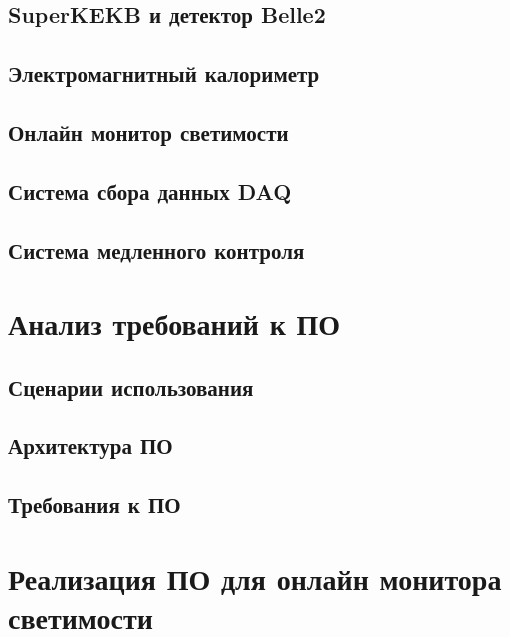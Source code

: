\documentclass[a4paper, 14pt]{extarticle}
\let\stdsection\section
\renewcommand\section{\newpage\stdsection}
\begin{document}
    \subsection{SuperKEKB и детектор Belle2}
    
    \subsection{Электромагнитный калориметр}
    
    \subsection{Онлайн монитор светимости}
    
    \subsection{Система сбора данных DAQ}
    
    \subsection{Система медленного контроля}
    

\section{Анализ требований к ПО}
    \subsection{Сценарии использования}
    
    \subsection{Архитектура ПО}
    
    \subsection{Требования к ПО}
    

\section{Реализация ПО для онлайн монитора светимости}
%    
\end{document}
